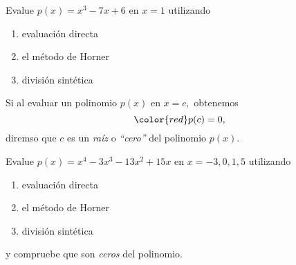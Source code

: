 	\begin{problema}
		Evalue $p(x)=x^{3}-7x+6$ en $x=1$ utilizando
		\begin{enumerate}
			\item evaluaci\'on directa 
			\item el m\'etodo de Horner 
			\item divisi\'on sint\'etica
		\end{enumerate} 
	\end{problema}



	\begin{definicion}
		Si al evaluar un polinomio $p(x)$ en $x=c,$ obtenemos 
		$$
		{\color{red} p(c)=0},
		$$
		diremso que $c$ es un \emph{ra\'iz} o \emph{``cero''} del polinomio $p(x).$
	\end{definicion}



	\begin{problema}
		Evalue $p(x)=x^{4}-3x^{3}-13x^{2}+15x$ en $x=-3,0,1,5$ utilizando
		\begin{enumerate}
			\item evaluaci\'on directa 
			\item el m\'etodo de Horner 
			\item divisi\'on sint\'etica
		\end{enumerate} 
	\end{problema} y compruebe que son \emph{ceros} del polinomio.

